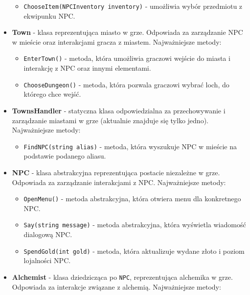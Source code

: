 \begin{itemize}
\begin{itemize}
                        \item \texttt{ChooseItem(NPCInventory inventory)} - umożliwia wybór przedmiotu z ekwipunku NPC.
                    \end{itemize}
                \item \textbf{Town} - klasa reprezentująca miasto w grze. Odpowiada za zarządzanie NPC w mieście oraz interakcjami gracza z miastem. Najważniejsze metody:
                    \begin{itemize}
                        \item \texttt{EnterTown()} - metoda, która umożliwia graczowi wejście do miasta i interakcję z NPC oraz innymi elementami.
                        \item \texttt{ChooseDungeon()} - metoda, która pozwala graczowi wybrać loch, do którego chce wejść.
                    \end{itemize}
                \item \textbf{TownsHandler} - statyczna klasa odpowiedzialna za przechowywanie i zarządzanie miastami w grze (aktualnie znajduje się tylko jedno). Najważniejsze metody:
                    \begin{itemize}
                        \item \texttt{FindNPC(string alias)} - metoda, która wyszukuje NPC w mieście na podstawie podanego aliasu.
                    \end{itemize}
                \item \textbf{NPC} - klasa abstrakcyjna reprezentująca postacie niezależne w grze. Odpowiada za zarządzanie interakcjami z NPC. Najważniejsze metody:
                    \begin{itemize}
                        \item \texttt{OpenMenu()} - metoda abstrakcyjna, która otwiera menu dla konkretnego NPC.
                        \item \texttt{Say(string message)} - metoda abstrakcyjna, która wyświetla wiadomość dialogową NPC.
                        \item \texttt{SpendGold(int gold)} - metoda, która aktualizuje wydane złoto i poziom lojalności NPC.
                    \end{itemize}
                \item \textbf{Alchemist} - klasa dziedzicząca po \texttt{NPC}, reprezentująca alchemika w grze. Odpowiada za interakcje związane z alchemią. Najważniejsze metody:
                    \begin{itemize}

\end{itemize}
\end{itemize}
